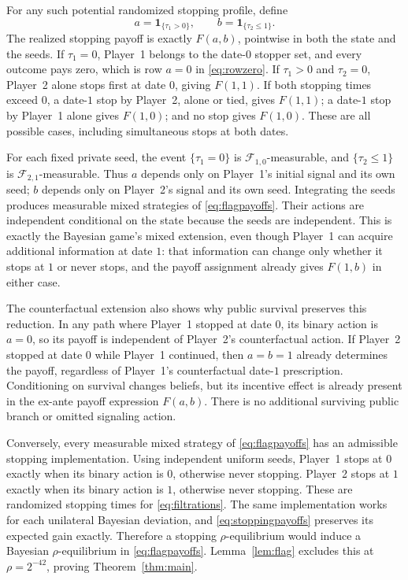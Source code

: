 \documentclass[11pt]{article}
\theoremstyle{remark}
\newcommand{\ind}{\mathbf 1}
\newcommand{\F}{\mathcal F}
\begin{document}
For any such potential randomized stopping profile, define
\begin{equation}\label{eq:actionsfromstops}
 a=\ind_{\{\tau_1>0\}},\qquad b=\ind_{\{\tau_2\le1\}}.
\end{equation}
The realized stopping payoff is exactly $F(a,b)$, pointwise in both the
state and the seeds.
If $\tau_1=0$, Player~1 belongs to the date-$0$ stopper set, and
every outcome pays zero, which is row $a=0$ in \eqref{eq:rowzero}.
If $\tau_1>0$ and $\tau_2=0$, Player~2 alone stops first at date
$0$, giving $F(1,1)$. If both stopping times exceed $0$, a date-$1$
stop by Player~2, alone or tied, gives $F(1,1)$; a date-$1$ stop by
Player~1 alone gives $F(1,0)$; and no stop gives $F(1,0)$. These
are all possible cases, including simultaneous stops at both dates.

For each fixed private seed, the event $\{\tau_1=0\}$ is
$\F_{1,0}$-measurable, and $\{\tau_2\le1\}$ is
$\F_{2,1}$-measurable. Thus $a$ depends only on Player~1's initial
signal and its own seed; $b$ depends only on Player~2's signal and its
own seed. Integrating the seeds produces measurable mixed strategies
of \eqref{eq:flagpayoffs}. Their actions are independent conditional
on the state because the seeds are independent. This is exactly the
Bayesian game's mixed extension, even though Player~1 can acquire
additional information at date $1$: that information can change only
whether it stops at $1$ or never stops, and the payoff assignment
already gives $F(1,b)$ in either case.

The counterfactual extension also shows why public survival preserves
this reduction. In any path where Player~1 stopped at date $0$, its
binary action is $a=0$, so its payoff is independent of Player~2's
counterfactual action. If Player~2 stopped at date $0$ while Player~1
continued, then $a=b=1$ already determines the payoff, regardless of
Player~1's counterfactual date-$1$ prescription. Conditioning on survival
changes beliefs, but its incentive effect is already present in the
ex-ante payoff expression $F(a,b)$. There is no additional surviving
public branch or omitted signaling action.

Conversely, every measurable mixed strategy of
\eqref{eq:flagpayoffs} has an admissible stopping implementation.
Using independent uniform seeds, Player~1 stops at $0$ exactly when
its binary action is $0$, otherwise never stopping. Player~2 stops at
$1$ exactly when its binary action is $1$, otherwise never stopping.
These are randomized stopping times for \eqref{eq:filtrations}.
The same implementation works for each unilateral Bayesian deviation,
and \eqref{eq:stoppingpayoffs} preserves its expected gain exactly.
Therefore a stopping $\rho$-equilibrium would induce a Bayesian
$\rho$-equilibrium in \eqref{eq:flagpayoffs}. Lemma~\ref{lem:flag}
excludes this at $\rho=2^{-42}$, proving Theorem~\ref{thm:main}.
\end{document}
